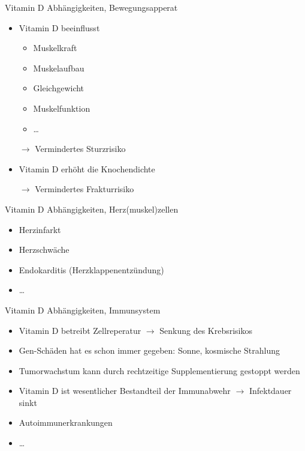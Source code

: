 \documentclass[xcolor=dvipsnames]{beamer}
\begin{document}
\begin{frame}[allowframebreaks]
        \begin{block}{Vitamin D Abhängigkeiten, Bewegungsapperat}
            \begin{itemize}
                \setlength\itemsep{1em}
                \item Vitamin D beeinflusst
                \begin{itemize}
                    \item Muskelkraft
                    \item Muskelaufbau
                    \item Gleichgewicht
                    \item Muskelfunktion
                    \item \ldots
                \end{itemize}
                \item[$\rightarrow$] Vermindertes Sturzrisiko
                \item Vitamin D erhöht die Knochendichte
                \item[$\rightarrow$] Vermindertes Frakturrisiko
            \end{itemize}
        \end{block}

        \framebreak

        \begin{block}{Vitamin D Abhängigkeiten, Herz(muskel)zellen}
            \begin{itemize}
                \setlength\itemsep{1em}
                \item Herzinfarkt
                \item Herzschwäche
                \item Endokarditis (Herzklappenentzündung)
                \item \ldots
            \end{itemize}
        \end{block}

        \framebreak

        \begin{block}{Vitamin D Abhängigkeiten, Immunsystem}
            \begin{itemize}
                \setlength\itemsep{1em}
                \item Vitamin D betreibt Zellreperatur $\rightarrow$ Senkung des Krebsrisikos
                \item Gen-Schäden hat es schon immer gegeben: Sonne, kosmische Strahlung
                \item Tumorwachstum kann durch rechtzeitige Supplementierung gestoppt werden
                \item Vitamin D ist wesentlicher Bestandteil der Immunabwehr $\rightarrow$ Infektdauer sinkt
                \item Autoimmunerkrankungen
                \item \ldots
            \end{itemize}
        \end{block}


\end{frame}
\end{document}
